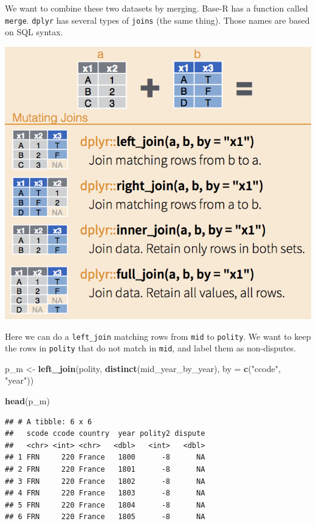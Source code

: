 \documentclass[]{book}
\newenvironment{Shaded}{\begin{snugshade}}{\end{snugshade}}
\newcommand{\DataTypeTok}[1]{\textcolor[rgb]{0.13,0.29,0.53}{#1}}
\newcommand{\KeywordTok}[1]{\textcolor[rgb]{0.13,0.29,0.53}{\textbf{#1}}}
\newcommand{\NormalTok}[1]{#1}
\newcommand{\StringTok}[1]{\textcolor[rgb]{0.31,0.60,0.02}{#1}}
\theoremstyle{definition}
\theoremstyle{definition}
\theoremstyle{definition}
\theoremstyle{remark}
\begin{document}
We want to combine these two datasets by merging. Base-R has a function called \texttt{merge}. \texttt{dplyr} has several types of \texttt{joins} (the same thing). Those names are based on SQL syntax.

\includegraphics{images/dplyr-joins.png}

Here we can do a \texttt{left\_join} matching rows from \texttt{mid} to \texttt{polity}. We want to keep the rows in \texttt{polity} that do not match in \texttt{mid}, and label them as non-disputes.

\begin{Shaded}
\begin{Highlighting}[]
\NormalTok{p_m <-}\StringTok{ }\KeywordTok{left_join}\NormalTok{(polity,}
                 \KeywordTok{distinct}\NormalTok{(mid_year_by_year),}
                 \DataTypeTok{by =} \KeywordTok{c}\NormalTok{(}\StringTok{"ccode"}\NormalTok{, }\StringTok{"year"}\NormalTok{))}

\KeywordTok{head}\NormalTok{(p_m)}
\end{Highlighting}
\end{Shaded}

\begin{verbatim}
## # A tibble: 6 x 6
##   scode ccode country  year polity2 dispute
##   <chr> <int> <chr>   <dbl>   <int>   <dbl>
## 1 FRN     220 France   1800      -8      NA
## 2 FRN     220 France   1801      -8      NA
## 3 FRN     220 France   1802      -8      NA
## 4 FRN     220 France   1803      -8      NA
## 5 FRN     220 France   1804      -8      NA
## 6 FRN     220 France   1805      -8      NA
\end{verbatim}
\end{document}

